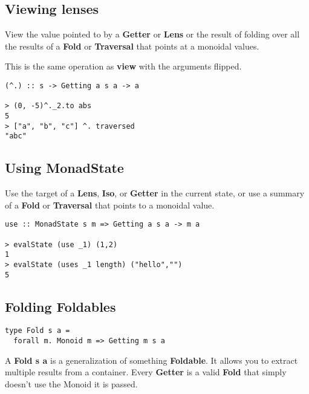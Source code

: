 \begin{multicols}{2}
\begin{box1}

\subsection *{Viewing lenses}

View the value pointed to by a \textbf{Getter} or \textbf{Lens} or the result
of folding over all the results of a \textbf{Fold} or \textbf{Traversal} that
points at a monoidal values.

This is the same operation as \textbf{view} with the arguments flipped.

\begin{verbatim}
(^.) :: s -> Getting a s a -> a 

> (0, -5)^._2.to abs
5
> ["a", "b", "c"] ^. traversed
"abc"
\end{verbatim}
\end{box1}

\begin{box2}
\subsection*{Using MonadState}

Use the target of a \textbf{Lens}, \textbf{Iso}, or \textbf{Getter} in the
current state, or use a summary of a \textbf{Fold} or \textbf{Traversal} that
points to a monoidal value.

\begin{verbatim}
use :: MonadState s m => Getting a s a -> m a

> evalState (use _1) (1,2)
1
> evalState (uses _1 length) ("hello","")
5
\end{verbatim}
\end{box2}

\columnbreak

\begin{box1}
\subsection *{Folding Foldables}
\begin{verbatim}
type Fold s a =
  forall m. Monoid m => Getting m s a
\end{verbatim}
A \textbf{Fold s a} is a generalization of something \textbf{Foldable}. It
allows you to extract multiple results from a container. Every \textbf{Getter}
is a valid \textbf{Fold} that simply doesn't use the Monoid it is passed.


\end{box1}
\end{multicols}
